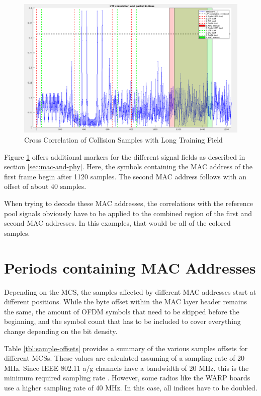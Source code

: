 \begin{figure}[H]
	\centering
	\includegraphics[width=\textwidth]{gfx/images/preamble-correlation}
	\caption{Cross Correlation of Collision Samples with Long Training Field}
	\label{fig:preamble-corr}
\end{figure}

Figure \ref{fig:preamble-corr} offers additional markers for the different signal fields as described in section \ref{sec:mac-and-phy}. Here, the symbols containing the MAC address of the first frame begin after 1120 samples. The second MAC address follows with an offset of about 40 samples.

When trying to decode these MAC addresses, the correlations with the reference pool signals obviously have to be applied to the combined region of the first and second MAC addresses. In this examples, that would be all of the colored samples.



\section{Periods containing MAC Addresses}\label{sec:mac-periods}

Depending on the \gls{MCS}, the samples affected by different MAC addresses start at different positions. While the byte offset within the MAC layer header remains the same, the amount of OFDM symbols that need to be skipped before the beginning, and the symbol count that has to be included to cover everything change depending on the bit density.

Table \ref{tbl:sample-offsets} provides a summary of the various samples offsets for different \glspl{MCS}. These values are calculated assuming of a sampling rate of 20 MHz. Since IEEE 802.11 a/g channels have a bandwidth of 20 MHz, this is the minimum required sampling rate \cite{ieee2012}. However, some radios like the WARP boards use a higher sampling rate of 40 MHz. In this case, all indices have to be doubled.\\

